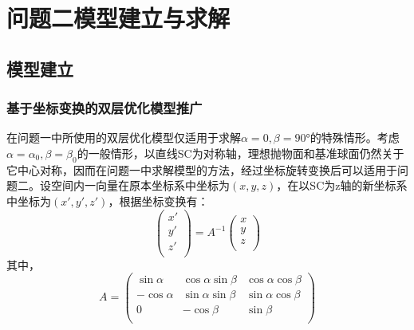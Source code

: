 \documentclass[withoutpreface,bwprint,fontset=macnew]{cumcmthesis} %
\begin{document}
	\section {问题二模型建立与求解}
	\subsection{模型建立}
	\subsubsection {基于坐标变换的双层优化模型推广}
		
		
		在问题一中所使用的双层优化模型仅适用于求解$\alpha =0, \beta = 90°$的特殊情形。考虑$\alpha = \alpha_0, \beta = \beta_0$的一般情形，以直线SC为对称轴，理想抛物面和基准球面仍然关于它中心对称，因而在问题一中求解模型的方法，经过坐标旋转变换后可以适用于问题二。设空间内一向量在原本坐标系中坐标为$(x,y,z)$，在以SC为z轴的新坐标系中坐标为$(x', y', z')$，根据坐标变换有：
		\begin{equation}
			\begin{pmatrix}
			    x' \\
			    y' \\
			    z' \\
			\end{pmatrix}=
			A^{-1}
			\begin{pmatrix}
			    x \\
			    y \\
			    z \\
			\end{pmatrix}
			\label{eq:coordinate_transform}
		\end{equation}
		其中，$$A = \begin{pmatrix}
						    \sin\alpha & \cos\alpha\sin\beta & \cos\alpha\cos\beta \\
						    -\cos\alpha & \sin\alpha\sin\beta & \sin\alpha\cos\beta \\
						    0 & -\cos\beta & \sin\beta \\
						\end{pmatrix}$$
		
\end{document}
